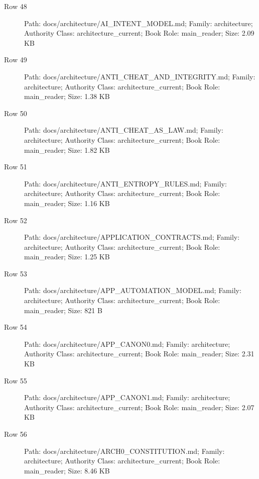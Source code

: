 \documentclass[9pt,a4paper]{book}
\begin{document}
\begin{description}
\item[Row 48] Path: docs/\allowbreak{}architecture/\allowbreak{}AI\_\allowbreak{}INTENT\_\allowbreak{}MODEL.\allowbreak{}md; Family: architecture; Authority Class: architecture\_\allowbreak{}current; Book Role: main\_\allowbreak{}reader; Size: 2.\allowbreak{}09 KB
\item[Row 49] Path: docs/\allowbreak{}architecture/\allowbreak{}ANTI\_\allowbreak{}CHEAT\_\allowbreak{}AND\_\allowbreak{}INTEGRITY.\allowbreak{}md; Family: architecture; Authority Class: architecture\_\allowbreak{}current; Book Role: main\_\allowbreak{}reader; Size: 1.\allowbreak{}38 KB
\item[Row 50] Path: docs/\allowbreak{}architecture/\allowbreak{}ANTI\_\allowbreak{}CHEAT\_\allowbreak{}AS\_\allowbreak{}LAW.\allowbreak{}md; Family: architecture; Authority Class: architecture\_\allowbreak{}current; Book Role: main\_\allowbreak{}reader; Size: 1.\allowbreak{}82 KB
\item[Row 51] Path: docs/\allowbreak{}architecture/\allowbreak{}ANTI\_\allowbreak{}ENTROPY\_\allowbreak{}RULES.\allowbreak{}md; Family: architecture; Authority Class: architecture\_\allowbreak{}current; Book Role: main\_\allowbreak{}reader; Size: 1.\allowbreak{}16 KB
\item[Row 52] Path: docs/\allowbreak{}architecture/\allowbreak{}APPLICATION\_\allowbreak{}CONTRACTS.\allowbreak{}md; Family: architecture; Authority Class: architecture\_\allowbreak{}current; Book Role: main\_\allowbreak{}reader; Size: 1.\allowbreak{}25 KB
\item[Row 53] Path: docs/\allowbreak{}architecture/\allowbreak{}APP\_\allowbreak{}AUTOMATION\_\allowbreak{}MODEL.\allowbreak{}md; Family: architecture; Authority Class: architecture\_\allowbreak{}current; Book Role: main\_\allowbreak{}reader; Size: 821 B
\item[Row 54] Path: docs/\allowbreak{}architecture/\allowbreak{}APP\_\allowbreak{}CANON0.\allowbreak{}md; Family: architecture; Authority Class: architecture\_\allowbreak{}current; Book Role: main\_\allowbreak{}reader; Size: 2.\allowbreak{}31 KB
\item[Row 55] Path: docs/\allowbreak{}architecture/\allowbreak{}APP\_\allowbreak{}CANON1.\allowbreak{}md; Family: architecture; Authority Class: architecture\_\allowbreak{}current; Book Role: main\_\allowbreak{}reader; Size: 2.\allowbreak{}07 KB
\item[Row 56] Path: docs/\allowbreak{}architecture/\allowbreak{}ARCH0\_\allowbreak{}CONSTITUTION.\allowbreak{}md; Family: architecture; Authority Class: architecture\_\allowbreak{}current; Book Role: main\_\allowbreak{}reader; Size: 8.\allowbreak{}46 KB

\end{description}
\end{document}
